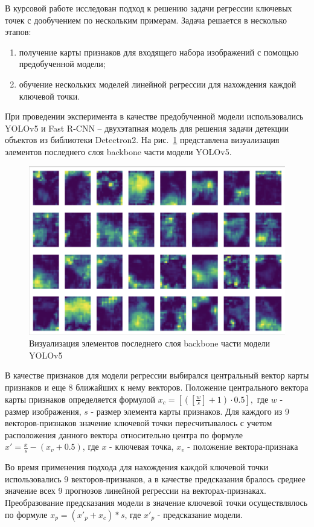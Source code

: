 \documentclass[a4paper,14pt]{article}
\begin{document}
    В курсовой работе исследован подход к решению задачи регрессии ключевых точек с дообучением по нескольким примерам. 
    Задача решается в несколько этапов:
     \begin{enumerate}
    	[1)]
    	\itemsep0em
    	\item получение карты признаков для входящего набора изображений с помощью предобученной модели;
    	\item обучение нескольких моделей линейной регрессии для нахождения каждой ключевой точки.
    \end{enumerate}
	При проведении эксперимента в качестве предобученной модели использовались YOLOv5 и Fast R-CNN -- двухэтапная модель для решения задачи детекции объектов из библиотеки Detectron2. 
	На рис.~\ref{fig:stage9_SPPF_features} представлена визуализация элементов последнего слоя backbone части модели YOLOv5.
	\begin{figure}[H]
		\centering
		\includegraphics[width=0.7\linewidth]{images/stage9_SPPF_features}
		\caption{Визуализация элементов последнего слоя backbone части модели YOLOv5}
		\label{fig:stage9_SPPF_features}
	\end{figure}
	
	В качестве признаков для модели регрессии выбирался центральный вектор карты признаков и еще 8 ближайших к нему векторов. 
	Положение центрального вектора карты признаков определяется формулой $x_c =\left[\left( [\frac{w}{s}]+1\right) \cdot 0.5\right],$ где $w$ - размер изображения, $s$ - размер элемента карты признаков.
	Для каждого из 9 векторов-признаков значение ключевой точки пересчитывалось с учетом расположения данного вектора относительно центра по формуле $x' = \frac{x}{s} - (x_v + 0.5)$, где $x$ - ключевая точка, $x_v$ - положение вектора-признака
	
	Во время применения подхода для нахождения каждой ключевой точки использовались 9 векторов-признаков, а в качестве предсказания бралось среднее значение всех 9 прогнозов линейной регрессии на векторах-признаках. 
	Преобразование предсказания модели в значение ключевой точки осуществлялось по формуле $x_p = (x'_p +  x_c) * s$, где $x'_p$ - предсказание модели.
    
\end{document}
